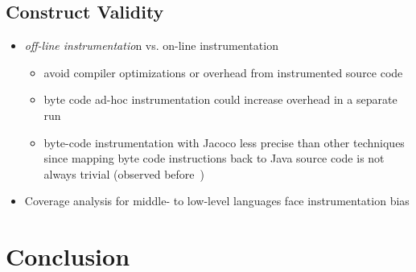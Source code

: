 \subsection{Construct Validity}\label{sec:construct_validity}
\begin{itemize}
	\item \textit{off-line instrumentatio}n vs. on-line instrumentation
	\begin{itemize}
		\item avoid compiler optimizations or overhead from instrumented source code
		\item byte code ad-hoc instrumentation could increase overhead in a separate run
		\item byte-code instrumentation with Jacoco less precise than other techniques since mapping byte code instructions back to Java source code is not always trivial (observed before~\cite{luo_2019_cova})
	\end{itemize}
	\item Coverage analysis for middle- to low-level languages face instrumentation bias
\end{itemize}

\cite{difallah_oltp_2013}

\section{Conclusion}
